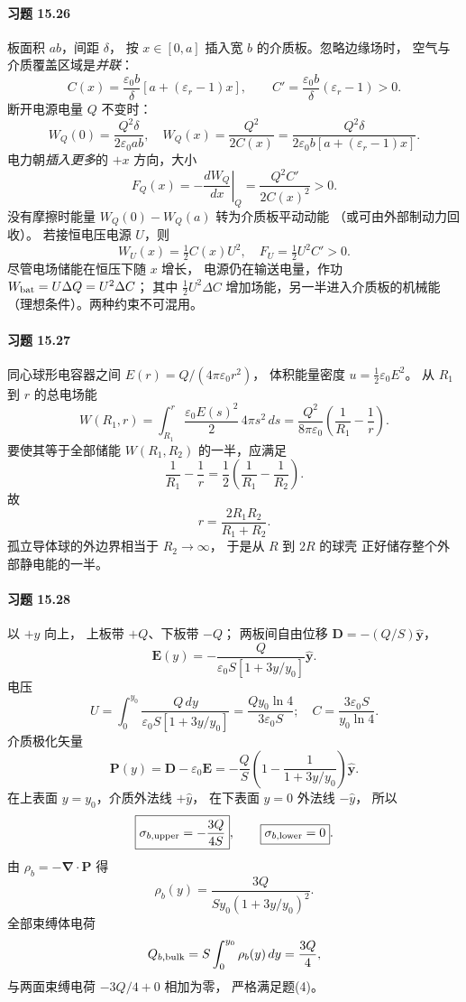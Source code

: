 \paragraph{习题 15.26}
板面积 \(ab\)，间距 \(\delta\)，
按 \(x\in[0,a]\) 插入宽 \(b\)
的介质板。忽略边缘场时，
空气与介质覆盖区域是\emph{并联}：
\[
 \boxed{C(x)=\frac{\varepsilon_0b}{\delta}
 [a+(\varepsilon_r-1)x]},\qquad
 C'=\frac{\varepsilon_0b}{\delta}(\varepsilon_r-1)>0.
\]
断开电源电量 \(Q\) 不变时：
\[
 \boxed{W_Q(0)=\frac{Q^2\delta}{2\varepsilon_0ab}},
\quad
 \boxed{W_Q(x)=\frac{Q^2}{2C(x)}
 =\frac{Q^2\delta}
 {2\varepsilon_0b[a+(\varepsilon_r-1)x]}}.
\]
电力朝\emph{插入更多}的 \(+x\) 方向，大小
\[
 \boxed{F_Q(x)=
 -\left.\frac{dW_Q}{dx}\right|_Q
 =\frac{Q^2C'}{2C(x)^2}>0}.
\]
没有摩擦时能量
\(W_Q(0)-W_Q(a)\) 转为介质板平动动能
（或可由外部制动力回收）。
若接恒电压电源 \(U\)，则
\[
 \boxed{W_U(x)=\tfrac12C(x)U^2},\quad
 \boxed{F_U=\tfrac12U^2C'>0}.
\]
尽管电场储能在恒压下随 \(x\) 增长，
电源仍在输送电量，作功
\(W_{\rm bat}=U\Delta Q=U^2\Delta C\)；
其中 \(\tfrac12U^2\Delta C\)
增加场能，另一半进入介质板的机械能
（理想条件）。两种约束不可混用。

\paragraph{习题 15.27}
同心球形电容器之间
\(E(r)=Q/(4\pi\varepsilon_0r^2)\)，
体积能量密度
\(u=\tfrac12\varepsilon_0E^2\)。
从 \(R_1\) 到 \(r\) 的总电场能
\[
 W(R_1,r)=\int_{R_1}^{r}
 \frac{\varepsilon_0E(s)^2}{2}\,4\pi s^2\,ds
 =\frac{Q^2}{8\pi\varepsilon_0}
 \left(\frac1{R_1}-\frac1r\right).
\]
要使其等于全部储能
\(W(R_1,R_2)\) 的一半，应满足
\[
 \frac1{R_1}-\frac1r
 =\frac12\left(\frac1{R_1}-\frac1{R_2}\right).
\]
故
\[
 \boxed{r=\frac{2R_1R_2}{R_1+R_2}}.
\]
孤立导体球的外边界相当于
\(R_2\to\infty\)，
于是从 \(R\) 到 \(2R\) 的球壳
正好储存整个外部静电能的一半。

\paragraph{习题 15.28}
以 \(+y\) 向上，
上板带 \(+Q\)、下板带 \(-Q\)；
两板间自由位移
\(\boldsymbol D=-(Q/S)\hat{\boldsymbol y}\)，
\[
 \boldsymbol E(y)=
 -\frac{Q}{\varepsilon_0S[1+3y/y_0]}
 \hat{\boldsymbol y}.
\]
电压
\[
 U=\int_0^{y_0}\frac{Q\,dy}
 {\varepsilon_0S[1+3y/y_0]}
 =\frac{Qy_0\ln4}{3\varepsilon_0S};
\quad
 \boxed{C=\frac{3\varepsilon_0S}{y_0\ln4}}.
\]
介质极化矢量
\[
 \boldsymbol P(y)=\boldsymbol D-\varepsilon_0\boldsymbol E
 =-\frac QS\left(1-\frac1{1+3y/y_0}\right)
 \hat{\boldsymbol y}.
\]
在上表面 \(y=y_0\)，介质外法线 \(+\hat y\)，
在下表面 \(y=0\) 外法线 \(-\hat y\)，
所以
\[
 \boxed{\sigma_{b,\rm upper}=-\frac{3Q}{4S}},
 \qquad
 \boxed{\sigma_{b,\rm lower}=0}.
\]
由 \(\rho_b=-\boldsymbol\nabla\cdot\boldsymbol P\) 得
\[
 \boxed{\rho_b(y)=\frac{3Q}{Sy_0
 (1+3y/y_0)^2}}.
\]
全部束缚体电荷
\[
 Q_{b,\rm bulk}=S\int_0^{y_0}\rho_b(y)\,dy
 =\frac{3Q}{4},
\]
与两面束缚电荷
\(-3Q/4+0\) 相加为零，
严格满足题(4)。

